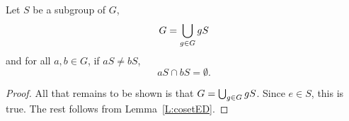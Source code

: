 \documentclass{ximera}
\begin{document}
\begin{theorem}\label{T:CPG}
  Let $S$ be a subgroup of $G$, 
  \[
  G = \bigcup_{g\in G} gS
  \]
  and for all $a,b\in G$, if $aS \ne bS$,
  \[
  aS\cap bS = \emptyset.
  \]
  \begin{proof}
    All that remains to be shown is that $G = \bigcup_{g\in G}
    gS$. Since $e\in S$, this is true. The rest follows from
    Lemma~\ref{L:cosetED}.
  \end{proof}
\end{theorem}






\end{document}
